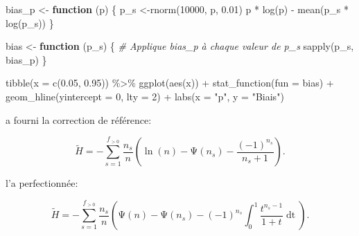 \documentclass[
  11pt,
  american,
  a4paper,
  extrafontsizes,onecolumn,openright
  ]{memoir}
\newenvironment{Shaded}{\begin{snugshade}}{\end{snugshade}}
\newcommand{\AttributeTok}[1]{\textcolor[rgb]{0.77,0.63,0.00}{#1}}
\newcommand{\CommentTok}[1]{\textcolor[rgb]{0.56,0.35,0.01}{\textit{#1}}}
\newcommand{\ControlFlowTok}[1]{\textcolor[rgb]{0.13,0.29,0.53}{\textbf{#1}}}
\newcommand{\DecValTok}[1]{\textcolor[rgb]{0.00,0.00,0.81}{#1}}
\newcommand{\FloatTok}[1]{\textcolor[rgb]{0.00,0.00,0.81}{#1}}
\newcommand{\FunctionTok}[1]{\textcolor[rgb]{0.00,0.00,0.00}{#1}}
\newcommand{\NormalTok}[1]{#1}
\newcommand{\OtherTok}[1]{\textcolor[rgb]{0.56,0.35,0.01}{#1}}
\newcommand{\SpecialCharTok}[1]{\textcolor[rgb]{0.00,0.00,0.00}{#1}}
\newcommand{\StringTok}[1]{\textcolor[rgb]{0.31,0.60,0.02}{#1}}
\newlength{\rf}
\begin{document}
\begin{Shaded}
\begin{Highlighting}[]
\NormalTok{bias\_p }\OtherTok{\textless{}{-}} \ControlFlowTok{function}\NormalTok{ (p) \{}
\NormalTok{  p\_s }\OtherTok{\textless{}{-}}\FunctionTok{rnorm}\NormalTok{(}\DecValTok{10000}\NormalTok{, p, }\FloatTok{0.01}\NormalTok{)}
\NormalTok{  p }\SpecialCharTok{*} \FunctionTok{log}\NormalTok{(p) }\SpecialCharTok{{-}} \FunctionTok{mean}\NormalTok{(p\_s }\SpecialCharTok{*} \FunctionTok{log}\NormalTok{(p\_s))}
\NormalTok{\}}

\NormalTok{bias }\OtherTok{\textless{}{-}} \ControlFlowTok{function}\NormalTok{ (p\_s) \{}
  \CommentTok{\# Applique bias\_p à chaque valeur de p\_s}
  \FunctionTok{sapply}\NormalTok{(p\_s, bias\_p)}
\NormalTok{\}}

\FunctionTok{tibble}\NormalTok{(}\AttributeTok{x =} \FunctionTok{c}\NormalTok{(}\FloatTok{0.05}\NormalTok{, }\FloatTok{0.95}\NormalTok{)) }\SpecialCharTok{\%\textgreater{}\%} 
  \FunctionTok{ggplot}\NormalTok{(}\FunctionTok{aes}\NormalTok{(x)) }\SpecialCharTok{+} 
    \FunctionTok{stat\_function}\NormalTok{(}\AttributeTok{fun =}\NormalTok{ bias) }\SpecialCharTok{+}
    \FunctionTok{geom\_hline}\NormalTok{(}\AttributeTok{yintercept =} \DecValTok{0}\NormalTok{, }\AttributeTok{lty =} \DecValTok{2}\NormalTok{) }\SpecialCharTok{+}
    \FunctionTok{labs}\NormalTok{(}\AttributeTok{x =} \StringTok{"p"}\NormalTok{, }\AttributeTok{y =} \StringTok{"Biais"}\NormalTok{)}
\end{Highlighting}
\end{Shaded}

\normalsize

\textcite{Grassberger1988} a fourni la correction de référence:

\begin{equation}
  \label{eq:Grassberger1988}
  \tilde{H}
  = -\sum^{f_{>0}}_{s=1}{
    \frac{n_s}{n} \left( \ln\left( n \right) - \mathrm{\Psi}\left( n_s \right) 
    -\frac{{\left( -1 \right)}^{n_s}}{n_s + 1} \right)
  }.
\end{equation}

\textcite{Grassberger2003} l'a perfectionnée:

\begin{equation}
  \label{eq:Grassberger2003}
  \tilde{H} 
  = -\sum^{f_{>0}}_{s=1}{
    \frac{n_s}{n} \left( \mathrm{\Psi}\left( n \right) - \mathrm{\Psi}\left( n_s \right)
    -{\left( -1 \right)}^{n_s} \int^1_0{\frac{t^{n_s - 1}}{1 + t} \mathop{dt}} \right)
  }.
\end{equation}
\end{document}
